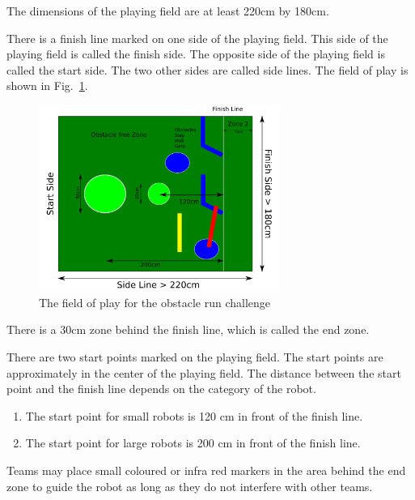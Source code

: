 \documentclass[12pt]{hurocup}
\begin{document}
\begin{lawlist}[OR]
\item The dimensions of the playing field are at least 220cm by
  180cm. 
\item There is a finish line marked on one side of the playing field.
  This side of the playing field is called the finish side. The
  opposite side of the playing field is called the start side. The two
  other sides are called side lines. The field of play is shown in
  Fig.~\ref{fig:obstacle-run}.  

  \begin{figure}
    \begin{center}
      \includegraphics[width=0.7\textwidth]{Figures/obstacle-run}
    \end{center}
    \caption{The field of play for the obstacle run challenge}
    \label{fig:obstacle-run}
  \end{figure}

\item There is a 30cm zone behind the finish line, which is called the
  end zone.
\item \label{or-start-points} There are two start points marked on
  the playing field. The start points are approximately in the center
  of the playing field. The distance between the start point and the
  finish line depends on the category of the robot.
  \begin{enumerate}
  \item The start point for small robots is 120 cm in front of the
    finish line. 
  \item The start point for large robots is 200 cm in front of the
    finish line. 
  \end{enumerate}
\item Teams may place small coloured or infra red markers in the area
  behind the end zone to guide the robot as long as they do not
  interfere with other teams.
\end{lawlist}
\end{document}
